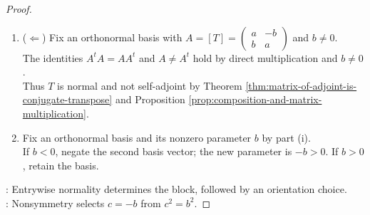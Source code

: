 \begin{proposition}
\begin{proof}
\begin{enumerate}[label=(\roman*)]
Equality of the off-diagonal entries is $-ab+bd=ab-bd$, so $d=a$.\\
The stated form holds in every orthonormal basis by arbitrariness of the basis.
\item[$(i)$] ($\Leftarrow$) Fix an orthonormal basis with $A=[T]=\left(\begin{smallmatrix}a&-b\\b&a\end{smallmatrix}\right)$ and $b\neq0$.\\
The identities $A^tA=AA^t$ and $A\neq A^t$ hold by direct multiplication and $b\neq0$.\\
Thus $T$ is normal and not self-adjoint by Theorem \ref{thm:matrix-of-adjoint-is-conjugate-transpose} and Proposition \ref{prop:composition-and-matrix-multiplication}.
\item[$(ii)$] Fix an orthonormal basis and its nonzero parameter $b$ by part (i).\\
If $b<0$, negate the second basis vector; the new parameter is $-b>0$. If $b>0$, retain the basis.
\end{enumerate}
: Entrywise normality determines the block, followed by an orientation choice.\\
: Nonsymmetry selects $c=-b$ from $c^2=b^2$.
\end{proof}
\end{proposition}

